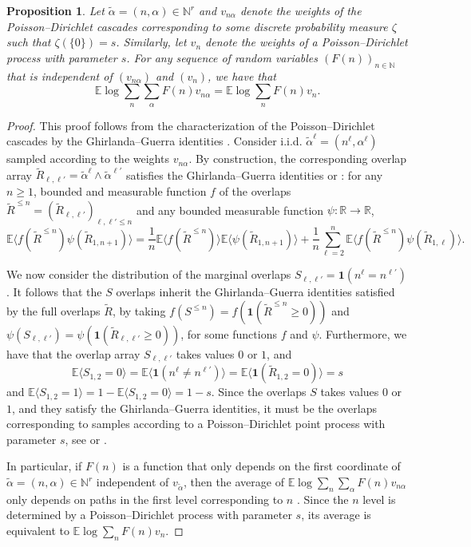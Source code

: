 \documentclass[11pt]{amsart}
\newtheorem{proposition}{Proposition}
\theoremstyle{remark}
\theoremstyle{definition}
\numberwithin{equation}{section}
\numberwithin{proposition}{section}
\numberwithin{figure}{section}
\numberwithin{table}{section}
\newcommand{\N}{\mathbb{N}}
\newcommand{\R}{\mathbb{R}}
\newcommand{\E}{\mathbb{E}}
\renewcommand{\leq}{\leqslant}
\renewcommand{\geq}{\geqslant}
\renewcommand{\tilde}{\widetilde}
\newcommand{\1}{\mathbf{1}}
\begin{document}
\begin{proposition}\label{prop:marginals}
Let  $\tilde \alpha = (n,\alpha) \in \N^{r}$ and $v_{n\alpha}$ denote the weights of the Poisson--Dirichlet cascades corresponding to some discrete probability measure $\zeta$ such that $\zeta(\{0\}) = s$. Similarly, let $v_{n}$ denote the weights of a Poisson--Dirichlet process with parameter $s$. For any sequence of random variables $(F(n))_{n \in \N}$ that is independent of $(v_{n\alpha})$ and $(v_n)$, we have that 
\[
\E \log \sum_{n} \sum_{\alpha} F(n) v_{n\alpha} = \E \log \sum_{n} F(n) v_{n}. 
\]
\end{proposition}
\begin{proof}
This proof follows from the characterization of the Poisson--Dirichlet cascades by the Ghirlanda--Guerra identities \cite[Chapter~5.6]{dominguez2024book}. Consider i.i.d. $\tilde \alpha^\ell =  (n^{\ell},\alpha^{\ell})$ sampled according to the weights $v_{n\alpha}$. By construction, the corresponding overlap array $\tilde R_{\ell,\ell'} =  \tilde \alpha^\ell \wedge \tilde \alpha^{\ell'}$ satisfies the Ghirlanda--Guerra identities \cite[Theorem~5.28]{dominguez2024book} or \cite[Theorem~2.10]{pan}: for any $n \geq 1$, bounded and measurable function $f$ of the overlaps $\tilde R^{\leq n} = (\tilde R_{\ell,\ell'})_{\ell,\ell' \leq n}$ and any bounded measurable function $\psi: \R \to \R$, 
\[
\E \langle f(\tilde R^{\leq n}) \psi(\tilde R_{1,n + 1}) \rangle = \frac{1}{n} \E \langle f(\tilde R^{\leq n}) \rangle \E \langle \psi(\tilde R_{1,n + 1}) \rangle  + \frac{1}{n} \sum_{\ell = 2}^n \E \langle f(\tilde R^{\leq n}) \psi(\tilde R_{1,\ell}) \rangle. 
\]

We now consider the distribution of the marginal overlaps $S_{\ell,\ell'} = \1(n^{\ell} = n^{\ell'})$. It follows that the $S$ overlaps inherit the Ghirlanda--Guerra identities satisfied by the full overlaps $\tilde R$, by taking $f(S^{\leq n}) = f( \1(\tilde R ^{\leq n} \geq 0) )$ and $\psi(S_{\ell,\ell'}) = \psi( \1(\tilde  R_{\ell,\ell'} \geq 0 ) )$, for some functions $f$ and $\psi$. Furthermore, we have that the overlap array $S_{\ell,\ell'} $ takes values $0$ or $1$, and
\[
\E \langle S_{1,2} = 0 \rangle  = \E \langle \1(n^{\ell} \neq n^{\ell'}) \rangle = \E \langle \1(\tilde R_{1,2} = 0) \rangle = s
\]
and $\E \langle S_{1,2} = 1 \rangle = 1 - \E \langle S_{1,2} = 0 \rangle  = 1 - s$. Since the overlaps $S$ takes values $0$ or $1$, and they satisfy the Ghirlanda--Guerra identities, it must be the overlaps corresponding to samples according to a Poisson--Dirichlet point process with parameter $s$, see \cite[Exercise 5.10]{dominguez2024book} or \cite[Theorem~2.8]{pan}. 

In particular, if $F(n)$ is a function that only depends on the first coordinate of $\tilde \alpha = (n,\alpha) \in \N^{r}$ independent of $v_{\tilde \alpha}$, then the average of $\E \log \sum_{n} \sum_{\alpha} F(n) v_{n\alpha}$ only depends on paths in the first level corresponding to $n$ \cite[Theorem~5.25]{dominguez2024book}. Since the $n$ level is determined by a Poisson--Dirichlet process with parameter $s$, its average is equivalent to $\E \log \sum_{n} F(n) v_{n}$.  
\end{proof}
\end{document}
